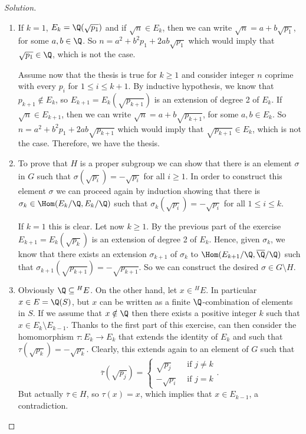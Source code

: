 \documentclass[a4paper,10pt,reqno]{amsart}
\newenvironment{sol}
  {\renewcommand\qedsymbol{$\blacksquare$}\begin{proof}[Solution]}
  {\end{proof}}
\begin{document}
\begin{sol}~
    \begin{enumerate}[label=(\roman*)]
    \item If $k=1$, $E_k=\Q(\sqrt{p_1})$ and if
    $\sqrt{n}\in E_k$, then we can write
    $\sqrt{n}=a+b\sqrt{p_1}$, for some $a,b\in \Q$.
    So $n=a^2+b^2p_1+2ab\sqrt{p_1}$
    which would imply that $\sqrt{p_1}\in\Q$, 
    which is not the case.

    Assume now that the thesis is true for $k\geq 1$
    and consider integer 
    $n$ coprime with every $p_i$ for $1\leq i\leq k+1$.
    By inductive hypothesis, we know that
    $p_{k+1}\notin E_k$, so $E_{k+1}=E_k(\sqrt{p_{k+1}})$
    is an extension of degree 2 of $E_k$.
    If $\sqrt{n}\in E_{k+1}$, then we can write 
    $\sqrt{n}=a+b\sqrt{p_{k+1}}$, for some $a,b\in E_k$.
    So $n=a^2+b^2p_1+2ab\sqrt{p_{k+1}}$
    which would imply that $\sqrt{p_{k+1}}\in E_k$, 
    which is not the case.
    Therefore, we have the thesis.
    \item To prove that $H$ is a proper subgroup
    we can show that there is an element $\sigma$ in $G$ 
    such that $\sigma(\sqrt{p_i})=-\sqrt{p_i}$
    for all $i\geq 1$.
    In order to construct this element $\sigma$ we can proceed again by induction showing that there is 
    $\sigma_k\in\Hom(E_k/\Q,E_k/\Q)$ such that
    $\sigma_k(\sqrt{p_i})=-\sqrt{p_i}$
    for all $1\leq i\leq k$.

    If $k=1$ this is clear. Let now $k\geq 1$.
    By the previous part of the 
    exercise $E_{k+1}=E_k(\sqrt{p_k})$ is an extension 
    of degree 2 of $E_k$.
    Hence, given $\sigma_k$, we know that there exists an extension $\sigma_{k+1}$ of $\sigma_k$
    to $\Hom(E_{k+1}/\Q,\overline{\Q}/\Q)$ such that
    $\sigma_{k+1}(\sqrt{p_{k+1}})=-\sqrt{p_{k+1}}$.
    So we can construct the desired $\sigma\in G\setminus H$.
    \item Obviously $\Q\subseteq {}^HE$.
    On the other hand, let $x\in {}^HE$.
    In particular $x\in E=\Q(S)$, but $x$ can be written
    as a finite $\Q$-combination of elements in $S$.
    If we assume that $x\notin\Q$ then there exists a positive integer $k$ 
    such that $x\in E_k\setminus E_{k-1}$.
    Thanks to the first part of this exercise,
    can then consider the homomorphism
    $\tau:E_k\to E_k$ that extends the identity
    of $E_k$ and such that
    $\tau(\sqrt{p_{k}})=-\sqrt{p_{k}}$.
    Clearly, this extends again to an element of $G$
    such that
     $$\overline{\tau}\left(\sqrt{p_j}\right)=\begin{cases}
        \sqrt{p_j} &\text{ if } j\neq k\\
        -\sqrt{p_i} &\text{ if } j=k
    \end{cases}.$$ 
    But actually $\overline{\tau}\in H$, so 
    $\tau(x)=x$, which implies that $x\in E_{k-1}$, a contradiction.\qedhere
    \end{enumerate}
\end{sol}
\end{document}
